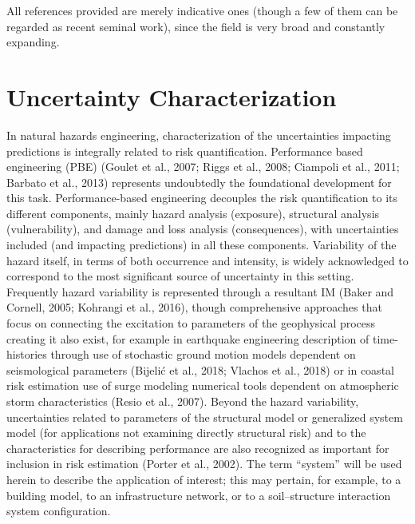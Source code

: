 All references provided are merely indicative ones (though a few of them can be regarded as recent seminal work), since the field is very broad and constantly expanding.

\section{Uncertainty Characterization}
\label{sec:uq_characterization}

In natural hazards engineering, characterization of the uncertainties impacting predictions is integrally related to risk quantification. Performance based engineering (PBE) (Goulet et al., 2007; Riggs et al., 2008; Ciampoli et al., 2011; Barbato et al., 2013) represents undoubtedly the foundational development for this task. Performance-based engineering decouples the risk quantification to its different components, mainly hazard analysis (exposure), structural analysis (vulnerability), and damage and loss analysis (consequences), with uncertainties included (and impacting predictions) in all these components. Variability of the hazard itself, in terms of both occurrence and intensity, is widely acknowledged to correspond to the most significant source of uncertainty in this setting. Frequently hazard variability is represented through a resultant IM (Baker and Cornell, 2005; Kohrangi et al., 2016), though comprehensive approaches that focus on connecting the excitation to parameters of the geophysical process creating it also exist, for example in earthquake engineering description of time-histories through use of stochastic ground motion models dependent on seismological parameters (Bijelić et al., 2018; Vlachos et al., 2018) or in coastal risk estimation use of surge modeling numerical tools dependent on atmospheric storm characteristics (Resio et al., 2007). Beyond the hazard variability, uncertainties related to parameters of the structural model or generalized system model (for applications not examining directly structural risk) and to the characteristics for describing performance are also recognized as important for inclusion in risk estimation (Porter et al., 2002). The term “system” will be used herein to describe the application of interest; this may pertain, for example, to a building model, to an infrastructure network, or to a soil–structure interaction system configuration. 

